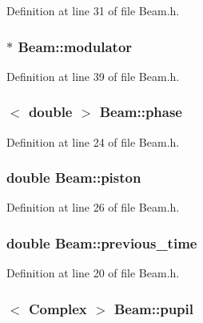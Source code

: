 Definition at line 31 of file Beam.h.

\hypertarget{classBeam_a1ef612af4b85d2e5866d40eec618efcb}{
\subsubsection[{modulator}]{$\ast$ {\bf Beam::modulator}}}
\label{classBeam_a1ef612af4b85d2e5866d40eec618efcb}


Definition at line 39 of file Beam.h.

\hypertarget{classBeam_aa2ed8956a6aca9da62da12bcb8cebb7b}{
\subsubsection[{phase}]{$<$ double $>$ {\bf Beam::phase}}}
\label{classBeam_aa2ed8956a6aca9da62da12bcb8cebb7b}


Definition at line 24 of file Beam.h.

\hypertarget{classBeam_a342991126e87a3a2aa89d04ff7b2fd0a}{
\subsubsection[{piston}]{\setlength{\rightskip}{0pt plus 5cm}double {\bf Beam::piston}}}
\label{classBeam_a342991126e87a3a2aa89d04ff7b2fd0a}


Definition at line 26 of file Beam.h.

\hypertarget{classBeam_ac1e58da3860afeb2d8d6e1daf7022cca}{
\subsubsection[{previous\_\-time}]{\setlength{\rightskip}{0pt plus 5cm}double {\bf Beam::previous\_\-time}}}
\label{classBeam_ac1e58da3860afeb2d8d6e1daf7022cca}


Definition at line 20 of file Beam.h.

\hypertarget{classBeam_a3b248c45a5630e6e0761b1f2d16350fc}{
\subsubsection[{pupil}]{$<$ {\bf Complex} $>$ {\bf Beam::pupil}}}
\label{classBeam_a3b248c45a5630e6e0761b1f2d16350fc}


